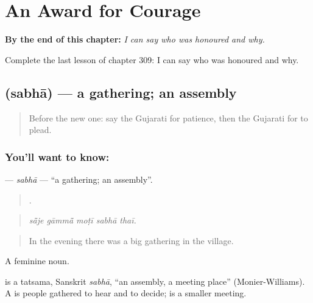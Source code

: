 
\chapter{An Award for Courage}
\label{ch:gu-an-award-for-courage}

\begin{chapteropening}
\textbf{By the end of this chapter:} \emph{I can say who was honoured and why.}

Complete the last lesson of chapter 309: I can say who was honoured and why.
\end{chapteropening}

\section[\texorpdfstring{\gu{સભા} (sabhā)}{સભા (sabhā)}]{ (sabhā) — a gathering; an assembly}

\label{lesson:GU-C309-sabha}



\begin{quote}
Before the new one: say the Gujarati for patience, then the Gujarati for to plead.
\end{quote}

\subsection*{You'll want to know: }
\textbf{} — \emph{sabhā} — \textquotedblleft{}a gathering; an assembly\textquotedblright{}.

\begin{quote}
    .
\end{quote}

\begin{quote}
\emph{sā̃je gāmmā̃ moṭī sabhā thaī.}
\end{quote}

\begin{quote}
In the evening there was a big gathering in the village.
\end{quote}

A feminine noun.

\begin{cousinweb}
is a tatsama, Sanskrit \emph{sabhā}, \textquotedblleft{}an assembly, a meeting place\textquotedblright{} (Monier-Williams). A \textbf{} is people gathered to hear and to decide; \textbf{} is a smaller meeting.
\end{cousinweb}


